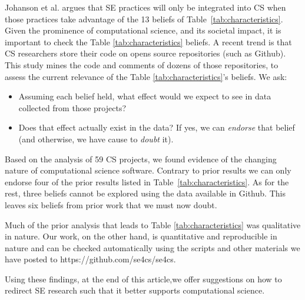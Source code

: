 \documentclass[sigconf,review,anonymous]{acmart}
\newcommand{\bi}{\begin{itemize}}
\newcommand{\ei}{\end{itemize}}
\begin{document}
Johanson et al. \cite{johan18_secs}   argues that SE practices will only be integrated into CS when
those practices take advantage of
the   13 beliefs  of
Table~\ref{tab:characteristics}. 
Given the prominence  of 
computational science, and its societal impact,
it is important to check the   Table \ref{tab:characteristics} beliefs.   A recent trend is that CS researchers store their code on opens source repositories (such as Github). This study mines the code and comments of dozens of those repositories, to assess the current relevance of the Table \ref{tab:characteristics}'s beliefs. We ask:
\bi
\item Assuming each belief held,
what effect would we expect to see in data collected
from those projects?
\item Does that effect actually exist in the data? 
If yes, we can {\em endorse} that belief (and otherwise, we have cause to {\em doubt} it). 
\ei

Based on the analysis of 59 CS projects, we found evidence
of the changing nature of computational science software. 
Contrary to prior results we can only endorse four of the prior results listed in Table~\ref{tab:characteristics}. As
for the rest, three beliefs cannot be explored using the data available in Github. This leaves six
beliefs from prior work that we must now doubt.

Much of the prior analysis that leads to Table \ref{tab:characteristics} was qualitative in nature. Our work, on the other hand, is quantitative and reproducible in nature and can be checked automatically using the scripts and other materials we have posted to  https://github.com/se4cs/se4cs. 

Using these findings, at the end of this article,we offer suggestions on how to redirect SE research such that it
better supports computational science.


 




\end{document}
